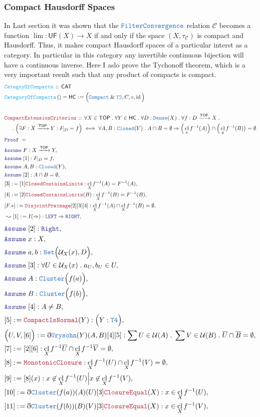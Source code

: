 \documentclass[12pt]{scrartcl}
\newcommand{\TYPE}[1]{\textcolor{NavyBlue}{\mathtt{#1}}}
\newcommand{\FUNC}[1]{\textcolor{Cerulean}{\mathtt{#1}}}
\newcommand{\LOGIC}[1]{\textcolor{Blue}{\mathtt{#1}}}
\newcommand{\THM}[1]{\textcolor{Maroon}{\mathtt{#1}}}
\renewcommand{\.}{\; . \;}
\newcommand{\de}{: \kern 0.1pc =}
\newcommand{\Act}[1]{\left( #1 \right)}
\newcommand{\Theorem}[2]{& \THM{#1} \, :: \, #2 \\ & \Proof = \\ }
\newcommand{\DeclareFunc}[2]{& \FUNC{#1} \, :: \, #2 \\}
\newcommand{\DefineNamedFunc}[4]{&  \FUNC{#1}\Act{#2} = #3 \de #4 \\}
\newcommand{\NewLine}{\\ & \kern 1pc}
\newcommand{\Page}[1]{ \begin{align*} #1 \end{align*}   }
\newcommand{ \bd }{ \ByDef }
\renewcommand{\And}{\; \& \;}
\newcommand{\Imply}{\Rightarrow}
\DeclareMathOperator*{\id}{id}
\newcommand{\Arrow}{\xrightarrow}
\newcommand{\Say}[3]{& #1 \de #2 : #3, \\}
\newcommand{\Derive}[3]{& \leadsto #1 \de #2 : #3, \\}
\newcommand{\Assume}[2]{& \LOGIC{Assume} \; #1 : #2, \\}
\newcommand{\ByDef}{\eth}
\newcommand{\Proof}{\LOGIC{Proof} \; }
\renewcommand{\C}{\mathcal{C}}
\newcommand{\CAT}{\mathsf{CAT}}
\DeclareMathOperator*{\cl}{cl}
\newcommand{\TOP}{\mathsf{TOP}}
\newcommand{\HC}{\mathsf{HC}}
\renewcommand{\U}{\mathcal{U}}
\begin{document}
\subsubsection{Compact Hausdorff Spaces}
In Last section it was shown that the $\TYPE{FilterConvergence}$ relation $\C$
becomes a function $\lim:\mathsf{UF}(X) \to X$ if and only if
the space $(X,\tau_\C)$ is compact and Hausdorff.  
Thus, it makes compact Hausdorff spaces of a particular interst as a category.
In particular in this category any invertible continuous bijection will have a 
continuous inverse.
Here I aslo prove the Tychonoff theorem, which is a very important result
such that any product of compacts is compact.
\Page{
	\DeclareFunc{CategoyOfCompacta}{\CAT}
	\DefineNamedFunc{CategoryOfCompacta}{}{\HC}{ \Big( \TYPE{Compact} \And \TYPE{T2}, C, \circ, \id \Big)  } 
	\\
	\Theorem{CompactExtensionCriterion}
	{
		\forall X \in \TOP \.
		\forall Y \in \HC \. 
		\forall D : \TYPE{Dense}(X) \.
		\forall f : D \Arrow{\TOP} X \.
		\NewLine \. 
		\Big(\exists F : X \Arrow{\TOP} Y  : F_{|D} = f \Big)    
		\iff
		\forall A,B : \TYPE{Closed}(Y) \.  
		A \cap B= \emptyset \Imply
		\Big(\cl_x f^{-1}(A)\Big) \cap \Big( \cl_y f^{-1}(B) \big) = \emptyset 
	}
	\Assume{F}{X \Arrow{\TOP} Y}
	\Assume{[1]}{F_{|D} = f }
	\Assume{A,B}{\TYPE{Closed}(Y)}
	\Assume{[2]}{A \cap B = \emptyset}
	\Say{[3]}{[1]\THM{ClosedContainsLimits}}{\cl_X f^{-1}(A) = F^{-1}(A) }
	\Say{[4]}{[2]\THM{ClosedContainsLimits}(B)}{\cl_X f^{-1}(B) = F^{-1}(B)}
	\Say{[F.*]}{\THM{DisjointPreimage}[2][3][4]}{ \cl_X f^{-1}(A) \cap \cl_X f^{-1}(B) = \emptyset }
	\Derive{[1]}{I(\Imply)}{\LOGIC{LEFT} \Imply \LOGIC{RIGHT}}
}\Page{
	\Assume{[2]}{\LOGIC{Right}}
	\Assume{x}{X}
	\Assume{a,b}{\TYPE{Net}\Big(\U_X(x),D\Big)}
	\Assume{[3]}{\forall  U \in \U_X(x) \.  a_U,b_U \in U}
	\Assume{A}{\TYPE{Cluster}\Big(f(a)\Big)}
	\Assume{B}{\TYPE{Cluster}\Big( f(b)\Big)}
	\Assume{[4]}{A \neq B}
	\Say{[5]}{\THM{CompactIsNormal}(Y)}{\Big( Y : \TYPE{T4}\Big)}
	\Say{\Big( U,V, [6] \Big)}
	{
		\bd \TYPE{Urysohn}(Y)(A,B)[4][5] 
	}
	{
		\sum U \in \U(A) \. \sum V \in \U(B) \. 
		\overline{U} \cap \overline{B} = \emptyset 
	}
	\Say{[7]}{[2][6]}{\cl_X f^{-1}\overline{U} \cap \cl_X f^{-1}\overline{V} = \emptyset}
	\Say{[8]}{\THM{MonotonicClosure}}{\cl_X f^{-1}(U) \cap \cl_X f^{-1}(V) = \emptyset}
	\Say{[9]}{[8](x)}{x \not \in \cl_X f^{-1}(U) \Big| x \not \in \cl_X f^{-1}(V) }
	\Say{[10]}{\bd \TYPE{Cluster}(f(a))(A)(U)[3]\THM{ClosureEqual}(X)}{x \in \cl_X f^{-1}(U)}
	\Say{[11]}{\bd \TYPE{Cluster}(f(b))(B)(V)[3]\THM{ClosureEqual}(X)}{x \in \cl_X f^{-1}(V)}
}
\end{document}
